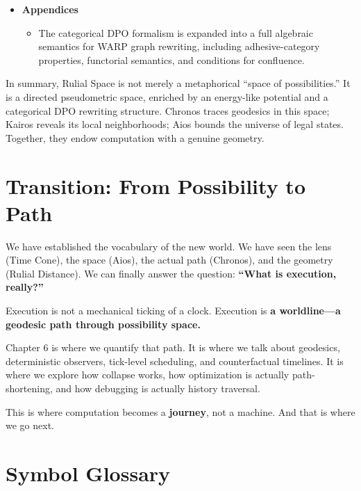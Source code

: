 \begin{itemize}
\item \textbf{Appendices}  
      \begin{itemize}
          \item The categorical DPO formalism is expanded into a full algebraic semantics for 
                WARP graph rewriting, including adhesive-category properties, functorial semantics, 
                and conditions for confluence.
      \end{itemize}

\end{itemize}

\vspace{1em}

In summary, Rulial Space is not merely a metaphorical ``space of possibilities.'' It is a directed pseudometric space, enriched by an energy-like potential and a categorical DPO rewriting structure. Chronos traces geodesics in this space; Kairos reveals its local neighborhoods; Aios bounds the universe of legal states. Together, they endow computation with a genuine geometry.

\section{Transition: From Possibility to Path}
\label{transition-from-possibility-to-path}

We have established the vocabulary of the new world. We have seen the lens (Time Cone), the space (Aios), the actual path (Chronos), and the geometry (Rulial Distance). We can finally answer the question: \textbf{``What is execution, really?''}

Execution is not a mechanical ticking of a clock. Execution is \textbf{a worldline—a geodesic path through possibility space.}

Chapter 6 is where we quantify that path. It is where we talk about geodesics, deterministic observers, tick-level scheduling, and counterfactual timelines. It is where we explore how collapse works, how optimization is actually path-shortening, and how debugging is actually history traversal.

This is where computation becomes a \textbf{journey}, not a machine. And that is where we go next.

\section*{Symbol Glossary}


